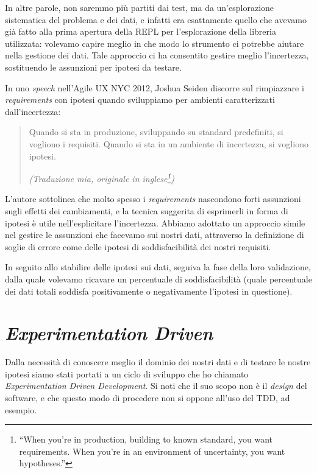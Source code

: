\documentclass[12pt]{report}
\begin{document}
In altre parole, non saremmo più partiti dai test, ma da un'esplorazione
sistematica del problema e dei dati, e infatti era esattamente quello che
avevamo già fatto alla prima apertura della REPL per l'esplorazione della
libreria utilizzata: volevamo capire meglio in che modo lo strumento ci
potrebbe aiutare nella gestione dei dati. Tale approccio ci ha consentito
gestire meglio l'incertezza, sostituendo le assunzioni per ipotesi da testare.

In uno \textit{speech} nell'Agile UX NYC 2012, Joshua Seiden discorre
sul rimpiazzare i \textit{requirements} con ipotesi quando sviluppiamo
per ambienti caratterizzati dall'incertezza: 

\begin{quote}
Quando si sta in produzione, sviluppando su standard predefiniti, si vogliono
i requisiti. Quando si sta in un ambiente di incertezza, si vogliono
ipotesi.\cite{seiden2012}

\flushright
\textit{(Traduzione mia, originale in inglese\footnote{
``When you're in production, building to known standard, you want requirements. 
When you're in an environment of uncertainty, you want hypotheses.''
})
}
\end{quote}

L'autore sottolinea che molto spesso i \textit{requirements}
nascondono forti assunzioni sugli effetti dei cambiamenti, e la
tecnica suggerita di esprimerli in forma di ipotesi è utile nell'esplicitare
l'incertezza. Abbiamo adottato un approccio simile nel gestire le assunzioni
che facevamo sui nostri dati, attraverso la definizione di soglie di errore
come delle ipotesi di soddisfacibilità dei nostri requisiti.

In seguito allo stabilire delle ipotesi sui dati, seguiva la fase
della loro validazione, dalla quale volevamo ricavare un percentuale
di soddisfacibilità (quale percentuale dei dati totali soddisfa
positivamente o negativamente l'ipotesi in questione).

\section{\textit{Experimentation Driven}}

Dalla necessità di conoscere meglio il dominio dei nostri dati e
di testare le nostre ipotesi siamo stati portati a un ciclo di sviluppo
che ho chiamato \textit{Experimentation Driven Development}. 
Si noti che il suo scopo non è il \textit{design} del software,
e che questo modo di procedere non si oppone all'uso del TDD, ad esempio. 
\end{document}
